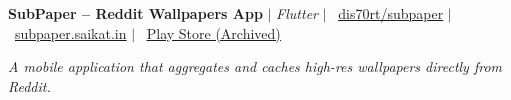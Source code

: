 \resumeProjectHeading
    {\textbf{SubPaper -- Reddit Wallpapers App} $|$ \emph{Flutter} $|$ \faGithub \ \href{https://github.com/dis70rt/subpaper}{\color{blue}\underline{dis70rt/subpaper}} $|$ \faGlobe \ \href{https://subpaper.saikat.in}{\color{blue}\underline{subpaper.saikat.in}} $|$ \faGooglePlay \ \href{https://play.google.com/store/apps/details?id=in.saikat.subpaper}{\color{blue}\underline{Play Store (Archived)}}}{}
    \item \small{\textit{A mobile application that aggregates and caches high-res wallpapers directly from Reddit.}}\vspace{-7pt}
    \resumeItemListStart
    \resumeItemListEnd
